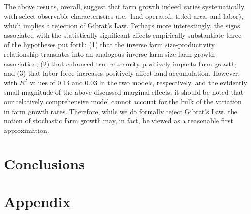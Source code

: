 \documentclass[english]{article}
\begin{document}
The above results, overall, suggest that farm growth indeed varies systematically with select observable characteristics (i.e.\ land operated, titled area, and labor), which implies a rejection of Gibrat's Law. Perhaps more interestingly, the signs associated with the statistically significant effects empirically substantiate three of the hypotheses put forth: (1) that the inverse farm size-productivity relationship translates into an analogous inverse farm size-farm growth association; (2) that enhanced tenure security positively impacts farm growth; and (3) that labor force increases positively affect land accumulation. However, with $R^2$ values of 0.13 and 0.03 in the two models, respectively, and the evidently small magnitude of the above-discussed marginal effects, it should be noted that our relatively comprehensive model cannot account for the bulk of the variation in farm growth rates. Therefore, while we do formally reject Gibrat's Law, the notion of stochastic farm growth may, in fact, be viewed as a reasonable first approximation.


\section{Conclusions}
\label{sec: conclusions}


\newpage
\cleardoublepage
\singlespacing




\newpage


\newpage
\doublespacing
\section*{Appendix}

\end{document}
